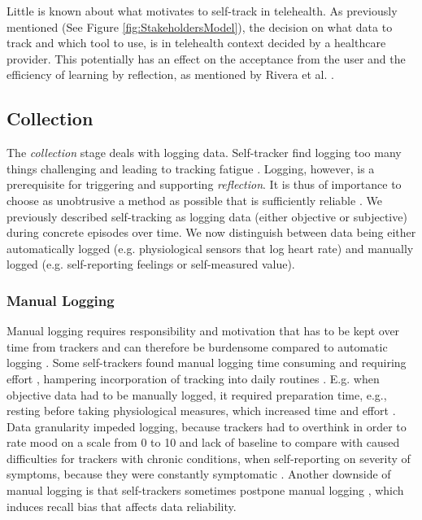 Little is known about what motivates to self-track in telehealth. As previously mentioned (See Figure \ref{fig:StakeholdersModel}), the decision on what data to track and which tool to use, is in telehealth context decided by a healthcare provider. This potentially has an effect on the acceptance from the user and the efficiency of learning by reflection, as mentioned by Rivera et al. \cite{Rivera}.

\subsection{Collection} 
The \textit{collection} stage deals with logging data. Self-tracker find logging too many things challenging and leading to tracking fatigue \cite{Choe2014, Patel2012}. Logging, however, is a prerequisite for triggering and supporting \textit{reflection}. It is thus of importance to choose as unobtrusive a method as possible that is sufficiently reliable \cite{Muller}. We previously described self-tracking as logging data (either objective or subjective) during concrete episodes over time. We now distinguish between data being either automatically logged (e.g. physiological sensors that log heart rate) and manually logged (e.g. self-reporting feelings or self-measured value). 

\subsubsection{Manual Logging}
Manual logging requires responsibility and motivation that has to be kept over time from trackers and can therefore be burdensome compared to automatic logging \cite{Li2010, Muller}. Some self-trackers found manual logging time consuming and requiring effort \cite{Ancker2015}, hampering incorporation of tracking into daily routines \cite{Verdezoto2015, Ancker2015}. E.g. when objective data had to be manually logged, it required preparation time, e.g., resting before taking physiological measures, which increased time and effort \cite{Verdezoto2015}. Data granularity impeded logging, because  trackers had to overthink in order to rate mood on a scale from 0 to 10 \cite{Oh2015} and lack of baseline to compare with caused difficulties for trackers with chronic conditions, when self-reporting on severity of symptoms, because they were constantly symptomatic \cite{piloting}. Another downside of manual logging is that self-trackers sometimes postpone manual logging \cite{MacLeod2014}, which induces recall bias that affects data reliability. 

